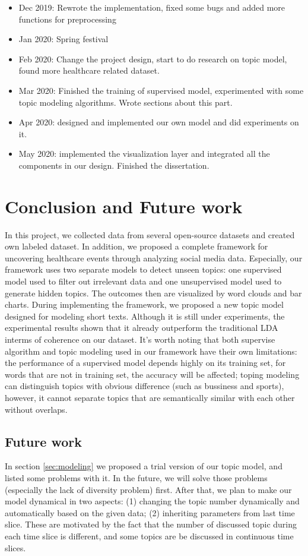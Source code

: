 \begin{itemize}
    \item Dec 2019: Rewrote the implementation, fixed some bugs and added more functions for preprocessing
    \item Jan 2020: Spring festival
    \item Feb 2020: Change the project design, start to do research on topic model, found more healthcare related dataset.
    \item Mar 2020: Finished the training of supervised model, experimented with some topic modeling algorithms. Wrote sections about this part.
    \item Apr 2020: designed and implemented our own model and did experiments on it.
    \item May 2020: implemented the visualization layer and integrated all the components in our design. Finished the dissertation.
\end{itemize} 

\section{Conclusion and Future work}
In this project, we collected data from several open-source datasets and created own labeled dataset. In addition, we proposed a complete framework for uncovering healthcare events through analyzing social media data. Especially, our framework uses two separate models to detect unseen topics: one supervised model used to filter out irrelevant data and one unsupervised model used to generate hidden topics. The outcomes then are visualized by word clouds and bar charts. During implementing the framework, we proposed a new topic model designed for modeling short texts. Although it is still under experiments, the experimental results shown that it already outperform the traditional LDA interms of coherence on our dataset. It's worth noting that both supervise algorithm and topic modeling used in our framework have their own limitations: the performance of a supervised model depends highly on its training set, for words that are not in training set, the accuracy will be affected; toping modeling can distinguish topics with obvious difference (such as bussiness and sports), however, it cannot separate topics that are semantically similar with each other without overlaps. 

\subsection{Future work}
In section \ref{sec:modeling} we proposed a trial version of our topic model, and listed some problems with it. In the future, we will solve those problems (especially the lack of diversity problem) first. After that, we plan to make our model dynamical in two aspects: (1) changing the topic number dynamically and automatically based on the given data; (2) inheriting parameters from last time slice. These are motivated by the fact that the number of discussed topic during each time slice is different, and some topics are be discussed in continuous time slices.